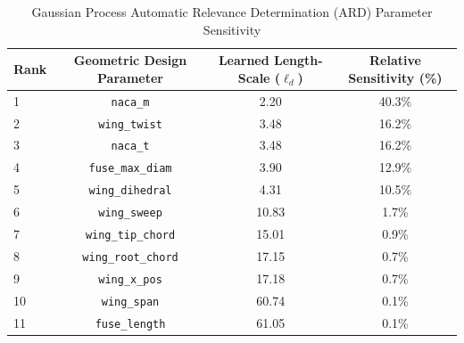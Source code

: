 \begin{table}[t]
\centering
\caption{Gaussian Process Automatic Relevance Determination (ARD) Parameter Sensitivity}
\label{tab:gp_ard_sensitivity}
\begin{tabular}{lccc}
\hline
\textbf{Rank} & \textbf{Geometric Design Parameter} & \textbf{Learned Length-Scale ($\ell_d$)} & \textbf{Relative Sensitivity (\%)} \\
\hline
1 & \texttt{naca\_m} & 2.20 & 40.3\% \\
2 & \texttt{wing\_twist} & 3.48 & 16.2\% \\
3 & \texttt{naca\_t} & 3.48 & 16.2\% \\
4 & \texttt{fuse\_max\_diam} & 3.90 & 12.9\% \\
5 & \texttt{wing\_dihedral} & 4.31 & 10.5\% \\
6 & \texttt{wing\_sweep} & 10.83 & 1.7\% \\
7 & \texttt{wing\_tip\_chord} & 15.01 & 0.9\% \\
8 & \texttt{wing\_root\_chord} & 17.15 & 0.7\% \\
9 & \texttt{wing\_x\_pos} & 17.18 & 0.7\% \\
10 & \texttt{wing\_span} & 60.74 & 0.1\% \\
11 & \texttt{fuse\_length} & 61.05 & 0.1\% \\
\hline
\end{tabular}
\end{table}

